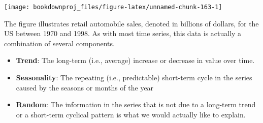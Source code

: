 \documentclass[
]{book}
\newenvironment{Shaded}{\begin{snugshade}}{\end{snugshade}}
\newcommand{\AttributeTok}[1]{\textcolor[rgb]{0.77,0.63,0.00}{#1}}
\newcommand{\ConstantTok}[1]{\textcolor[rgb]{0.00,0.00,0.00}{#1}}
\newcommand{\DecValTok}[1]{\textcolor[rgb]{0.00,0.00,0.81}{#1}}
\newcommand{\FunctionTok}[1]{\textcolor[rgb]{0.00,0.00,0.00}{#1}}
\newcommand{\NormalTok}[1]{#1}
\newcommand{\OtherTok}[1]{\textcolor[rgb]{0.56,0.35,0.01}{#1}}
\newcommand{\SpecialCharTok}[1]{\textcolor[rgb]{0.00,0.00,0.00}{#1}}
\newcommand{\StringTok}[1]{\textcolor[rgb]{0.31,0.60,0.02}{#1}}
\begin{document}
\begin{Shaded}
\end{Shaded}

\begin{center}\texttt{[image: bookdownproj\_files/figure-latex/unnamed-chunk-163-1]} \end{center}

The figure illustrates retail automobile sales, denoted in billions of dollars, for the US between 1970 and 1998. As with most time series, this data is actually a combination of several components.

\begin{itemize}
\item
  \textbf{Trend}: The long-term (i.e., average) increase or decrease in value over time.
\item
  \textbf{Seasonality}: The repeating (i.e., predictable) short-term cycle in the series caused by the seasons or months of the year
\item
  \textbf{Random}: The information in the series that is not due to a long-term trend or a short-term cyclical pattern is what we would actually like to explain.
\end{itemize}
\end{document}
